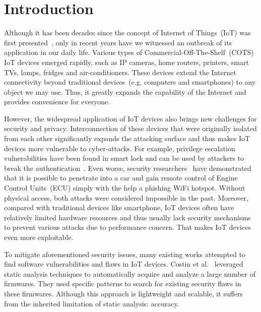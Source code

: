 \section{Introduction}\label{sec:intro}

Although it has been decades since the concept of Internet of Things~(IoT) was first presented~\cite{wikiiot}, only in recent years have we witnessed an outbreak of its application in our daily life. Various types of Commercial-Off-The-Shelf~(COTS) IoT devices emerged rapidly, such as IP cameras, home routers, printers, smart TVs, lamps, fridges and air-conditioners. These devices extend the Internet connectivity beyond traditional devices~(e.g. computers and smartphones) to any object we may use. Thus, it greatly expands the capability of the Internet and provides convenience for everyone.

However, the widespread application of IoT devices also brings new challenges for security and privacy. Interconnection of these devices that were originally isolated from each other significantly expands the attacking surface and thus makes IoT devices more vulnerable to cyber-attacks. For example, privilege escalation vulnerabilities have been found in smart lock and can be used by attackers to break the authentication~\cite{lock}. Even worse, security researchers~\cite{nie2017free} have demonstrated that it is possible to penetrate into a car and gain remote control of Engine Control Units~(ECU) simply with the help a phishing WiFi hotspot. Without physical access, both attacks were considered impossible in the past. Moreover, compared with traditional devices like smartphone, IoT devices often have relatively limited hardware resources and thus usually lack security mechanisms to prevent various attacks due to performance concern. That makes IoT devices even more exploitable.

To mitigate aforementioned security issues, many existing works attempted to find software vulnerabilities and flaws in IoT devices. Costin et al.~\cite{costin2014large} leveraged static analysis techniques to automatically acquire and analyze a large number of firmwares. They used specific patterns to search for existing security flaws in these firmwares. Although this approach is lightweight and scalable, it suffers from the inherited limitation of static analysis: accuracy.


